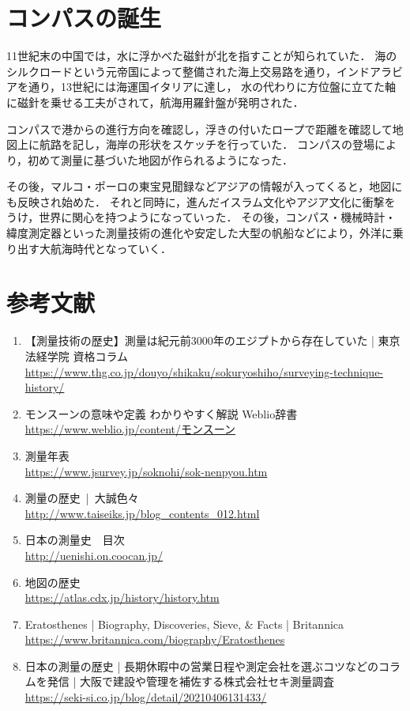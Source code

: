 \documentclass[titlepage]{jarticle}
\begin{document}
\section{コンパスの誕生}
11世紀末の中国では，水に浮かべた磁針が北を指すことが知られていた．
海のシルクロードという元帝国によって整備された海上交易路を通り，インドアラビアを通り，13世紀には海運国イタリアに達し，
水の代わりに方位盤に立てた軸に磁針を乗せる工夫がされて，航海用羅針盤が発明された．

コンパスで港からの進行方向を確認し，浮きの付いたロープで距離を確認して地図上に航路を記し，海岸の形状をスケッチを行っていた．
コンパスの登場により，初めて測量に基づいた地図が作られるようになった．

その後，マルコ・ポーロの東宝見聞録などアジアの情報が入ってくると，地図にも反映され始めた．
それと同時に，進んだイスラム文化やアジア文化に衝撃をうけ，世界に関心を持つようになっていった．
その後，コンパス・機械時計・緯度測定器といった測量技術の進化や安定した大型の帆船などにより，外洋に乗り出す大航海時代となっていく．
\section*{参考文献}
\begin{enumerate}
      \item 【測量技術の歴史】測量は紀元前3000年のエジプトから存在していた | 東京法経学院 資格コラム\\
            \url{https://www.thg.co.jp/douyo/shikaku/sokuryoshiho/surveying-technique-history/}
      \item モンスーンの意味や定義 わかりやすく解説 Weblio辞書\\
            \url{https://www.weblio.jp/content/モンスーン}
      \item 測量年表\\
            \url{https://www.jsurvey.jp/soknohi/sok-nenpyou.htm}
      \item 測量の歴史 | 大誠色々\\
            \url{http://www.taiseiks.jp/blog_contents_012.html}
      \item 日本の測量史　目次\\
            \url{http://uenishi.on.coocan.jp/}
      \item 地図の歴史\\
            \url{https://atlas.cdx.jp/history/history.htm}
      \item Eratosthenes | Biography, Discoveries, Sieve, \& Facts | Britannica\\
            \url{https://www.britannica.com/biography/Eratosthenes}
      \item 日本の測量の歴史 | 長期休暇中の営業日程や測定会社を選ぶコツなどのコラムを発信 | 大阪で建設や管理を補佐する株式会社セキ測量調査\\
            \url{https://seki-si.co.jp/blog/detail/20210406131433/}
\end{enumerate}
% 
\end{document}
